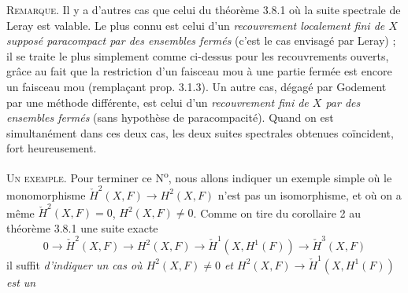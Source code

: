 \textsc{Remarque.} Il y a d'autres cas que celui du théorème 3.8.1 où
la suite spectrale de Leray est valable. Le plus connu est celui d'un
\textit{recouvrement localement fini de $X$ supposé paracompact par des
ensembles fermés} (c'est le cas envisagé par Leray) ; il se traite le plus
simplement comme ci-dessus pour les recouvrements ouverts, grâce au fait que
la restriction d'un faisceau mou à une partie fermée est encore un faisceau
mou (remplaçant prop. 3.1.3). Un autre cas, dégagé par Godement par une méthode
différente, est celui d'un \textit{recouvrement fini de $X$ par des ensembles
fermés} (sans hypothèse de paracompacité). Quand on est simultanément dans ces
deux cas, les deux suites spectrales obtenues coïncident, fort heureusement.

\textsc{Un exemple.} Pour terminer ce N\textsuperscript{o}, nous
allons indiquer un exemple simple où le monomorphisme
$\check H^2(X,F)\to H^2(X,F)$ n'est pas un isomorphisme, et où on
a même $\check H^2(X,F)=0$, $H^2(X,F)\neq 0$. Comme on tire du corollaire 2 au
théorème 3.8.1 une suite exacte
\[
0\to\check H^2(X,F)\to H^2(X,F)
\to\check H^1(X,H^1(F))\to\check H^3(X,F)
\]
il suffit \textit{d'indiquer un cas où $H^2(X,F)\neq 0$ et
$H^2(X,F)\to\check H^1(X,H^1(F))$ est un}

